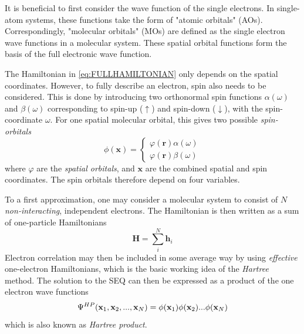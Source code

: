 It is beneficial to first consider the wave function of the single electrons. In single-atom systems, these functions take the form of "atomic orbitals" (AOs). Correspondingly, "molecular orbitals" (MOs) are defined as the single electron wave functions in a molecular system. These spatial orbital functions form the basis of the full electronic wave function.  

The Hamiltonian in \ref{eq:FULLHAMILTONIAN} only depends on the spatial coordinates. However, to fully describe an electron, spin also needs to be considered. This is done by introducing two orthonormal spin functions $\alpha(\omega)$ and $\beta(\omega)$ corresponding to spin-up ($\uparrow$) and spin-down ($\downarrow$), with the spin-coordinate $\omega$. For one spatial molecular orbital, this gives two possible \emph{spin-orbitals}
\begin{equation}
\phi(\mathbf{x}) = \left\lbrace\begin{matrix}
\varphi(\mathbf{r}) \alpha(\omega) \\
\varphi(\mathbf{r}) \beta(\omega)
\end{matrix} \right.
\end{equation}
\noindent where $\varphi$ are the \emph{spatial orbitals}, and $\mathbf{x}$ are the combined spatial and spin coordinates. The spin orbitals therefore depend on four variables.

To a first approximation, one may consider a molecular system to consist of $N$ \emph{non-interacting}, independent electrons. The Hamiltonian is then written as a sum of one-particle Hamiltonians 
\begin{equation}
\mathbf{H} = \sum_i^N \mathbf{h}_i 
\end{equation}
\noindent Electron correlation may then be included in some average way by using \emph{effective} one-electron Hamiltonians, which is the basic working idea of the \emph{Hartree} method. The solution to the SEQ can then be expressed as a product of the one electron wave functions
\begin{equation}
\Psi^{HP}(\mathbf{x}_1,\mathbf{x}_2,...,\mathbf{x}_N) = \phi(\mathbf{x}_1) \phi(\mathbf{x}_2) ... \phi(\mathbf{x}_N)
\end{equation}
\noindent which is also known as \emph{Hartree product}. 

